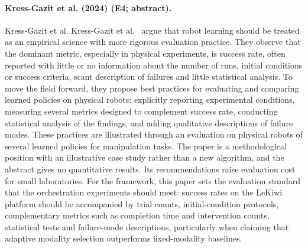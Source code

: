 \documentclass[10pt,a4paper]{article}
\begin{document}
\paragraph{Kress-Gazit et al. (2024) (E4; abstract).} Kress-Gazit et al. Kress-Gazit et al.~\cite{KressGazit2024} argue that robot learning should be treated as an empirical science with more rigorous evaluation practice. They observe that the dominant metric, especially in physical experiments, is success rate, often reported with little or no information about the number of runs, initial conditions or success criteria, scant description of failures and little statistical analysis. To move the field forward, they propose best practices for evaluating and comparing learned policies on physical robots: explicitly reporting experimental conditions, measuring several metrics designed to complement success rate, conducting statistical analysis of the findings, and adding qualitative descriptions of failure modes. These practices are illustrated through an evaluation on physical robots of several learned policies for manipulation tasks. The paper is a methodological position with an illustrative case study rather than a new algorithm, and the abstract gives no quantitative results. Its recommendations raise evaluation cost for small laboratories. For the framework, this paper sets the evaluation standard that the orchestration experiments should meet: success rates on the LeKiwi platform should be accompanied by trial counts, initial-condition protocols, complementary metrics such as completion time and intervention counts, statistical tests and failure-mode descriptions, particularly when claiming that adaptive modality selection outperforms fixed-modality baselines.
\end{document}

